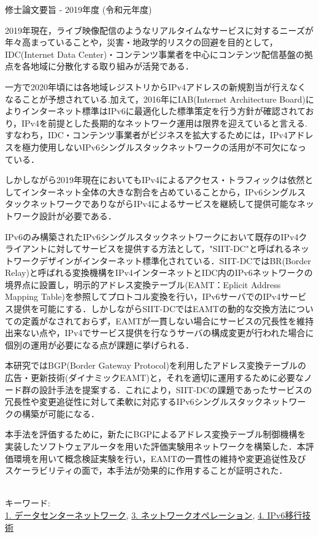 修士論文要旨 - 2019年度 (令和元年度)
\begin{center}
\begin{large}
\end{large}
\end{center}

2019年現在，ライブ映像配信のようなリアルタイムなサービスに対するニーズが年々高まっていることや，災害・地政学的リスクの回避を目的として，IDC(Internet Data Center)・コンテンツ事業者を中心にコンテンツ配信基盤の拠点を各地域に分散化する取り組みが活発である．

一方で2020年頃には各地域レジストリからIPv4アドレスの新規割当が行えなくなることが予想されている.加えて，2016年にIAB(Internet Architecture Board)によりインターネット標準はIPv6に最適化した標準策定を行う方針が確認されており，IPv4を前提とした長期的なネットワーク運用は限界を迎えていると言える.すなわち，IDC・コンテンツ事業者がビジネスを拡大するためには，IPv4アドレスを極力使用しないIPv6シングルスタックネットワークの活用が不可欠になっている．

しかしながら2019年現在においてもIPv4によるアクセス・トラフィックは依然としてインターネット全体の大きな割合を占めていることから，IPv6シングルスタックネットワークでありながらIPv4によるサービスを継続して提供可能なネットワーク設計が必要である．

IPv6のみ構築されたIPv6シングルスタックネットワークにおいて既存のIPv4クライアントに対してサービスを提供する方法として，"SIIT-DC"と呼ばれるネットワークデザインがインターネット標準化されている．SIIT-DCではBR(Border Relay)と呼ばれる変換機構をIPv4インターネットとIDC内のIPv6ネットワークの境界点に設置し，明示的アドレス変換テーブル(EAMT：Eplicit Address Mapping Table)を参照してプロトコル変換を行い，IPv6サーバでのIPv4サービス提供を可能にする．しかしながらSIIT-DCではEAMTの動的な交換方法についての定義がなされておらず，EAMTが一貫しない場合にサービスの冗長性を維持出来ない点や，IPv4でサービス提供を行なうサーバの構成変更が行われた場合に個別の運用が必要になる点が課題に挙げられる．

本研究ではBGP(Border Gateway Protocol)を利用したアドレス変換テーブルの広告・更新技術(ダイナミックEAMT)と，それを適切に運用するために必要なノード群の設計手法を提案する．これにより，SIIT-DCの課題であったサービスの冗長性や変更追従性に対して柔軟に対応するIPv6シングルスタックネットワークの構築が可能になる．

本手法を評価するために，新たにBGPによるアドレス変換テーブル制御機構を実装したソフトウェアルータを用いた評価実験用ネットワークを構築した．本評価環境を用いて概念検証実験を行い，EAMTの一貫性の維持や変更追従性及びスケーラビリティの面で，本手法が効果的に作用することが証明された．



~ \\
キーワード:\\
\underline{1. データセンターネットワーク},
\underline{3. ネットワークオペレーション},
\underline{4. IPv6移行技術}
\begin{flushright}
\dept \\
\author
\end{flushright}

